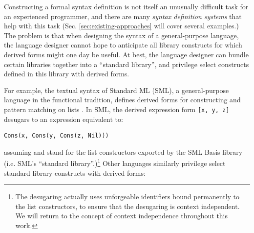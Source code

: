 
Constructing a formal syntax definition is not itself an unusually difficult task for an experienced programmer, and there are many \emph{syntax definition systems} that help with this task (Sec. \ref{sec:existing-approaches} will cover several examples.) The problem is that when designing the syntax of a general-purpose language, the language designer cannot hope to anticipate all library constructs for which derived forms might one day be useful. At best, the language designer can bundle certain libraries together into a ``standard library'', and privilege select constructs defined in this library with derived forms. 

For example, the textual syntax of Standard ML (SML), a general-purpose language in the functional tradition, defines derived forms for constructing and pattern matching on lists \cite{mthm97-for-dart,harper1997programming}. In SML, the derived expression form \lstinline{[x, y, z]} desugars to an expression equivalent to:
\begin{lstlisting}[numbers=none]
Cons(x, Cons(y, Cons(z, Nil)))
\end{lstlisting}
assuming  and  stand for the list constructors exported by the SML Basis library (i.e. SML's ``standard library''.)\footnote{The desugaring actually uses unforgeable identifiers bound permanently to the list constructors, to ensure that the desugaring is context independent. We will return to the concept of context independence throughout this work.} Other languages similarly privilege select standard library constructs with derived forms:

